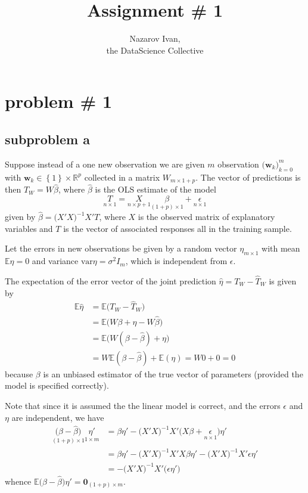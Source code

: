 \documentclass[a4paper]{article}
\title{Assignment \# 1}
\author{Nazarov Ivan, \rus{101мНОД(ИССА)}\\the DataScience Collective}
\newcommand{\obj}[1]{{\left\{ #1 \right \}}}
\newcommand{\w}{\mathbf{w}}
\newcommand{\Real}{\mathbb{R}}
\newcommand{\Ex}{\mathbb{E}}
\newcommand{\Var}{\text{var}}
\begin{document}
\maketitle

\tableofcontents
\clearpage

\section{problem \# 1} %
\label{sec:problem_1}

\subsection{subproblem a} %
\label{sub:subproblem_a}

Suppose instead of a one new observation we are given $m$ observation
$\big(\w_k\big)_{k=0}^m$ with $\w_k\in \obj{1}\times\Real^p$
collected in a matrix $W_{m\times 1+p}$. The vector of predictions
is then $\hat{T}_W = W\hat{\beta}$, where $\hat{\beta}$ is the OLS estimate of
the model
\[ \underset{n\times 1}{T} = \underset{n\times p+1}{X} \underset{(1+p)\times 1}{\beta} + \underset{n\times 1}{\epsilon}\]
given by $\hat{\beta} = \big(X'X\big)^{-1} X'T$, where $X$ is the observed matrix of explanatory variables and $T$ is the vector of associated responses
all in the training sample.

Let the errors in new observations be given by a random vector $\eta_{m\times 1}$ with mean $\Ex \eta = 0$ and variance $\Var \eta = \sigma^2 I_m$,
which is independent from $\epsilon$.

The expectation of the error vector of the joint prediction $\hat{\eta} = T_W - \hat{T}_W$ is given by
\begin{align*}
	\Ex \hat{\eta} &= \Ex\Big( T_W - \hat{T}_W \Big) \\
	&= \Ex\Big( W\beta + \eta - W\hat{\beta} \Big) \\
	&= \Ex\Big( W (\beta - \hat{\beta}) + \eta \Big) \\
	&= W \Ex(\beta - \hat{\beta}) + \Ex(\eta) = W 0 + 0 = 0
\end{align*}
because $\beta$ is an unbiased estimator of the true vector of parameters
(provided the model is specified correctly).

Note that since it is assumed the the linear model is correct, and the errors
$\epsilon$ and $\eta$ are independent, we have
\begin{align*}
	\underset{(1+p)\times 1}{\big(\beta-\hat{\beta}\big)}\underset{1\times m}{\eta'}
	&= \beta\eta' - \big(X'X\big)^{-1} X'\big(X\beta + \underset{n\times 1}{\epsilon}) \eta' \\
	&= \beta\eta' - \big(X'X\big)^{-1} X'X\beta\eta' - \big(X'X\big)^{-1} X'\epsilon \eta' \\
	&=  - \big(X'X\big)^{-1} X' \big( \epsilon \eta' \big)
\end{align*}
whence $\Ex \big(\beta-\hat{\beta}\big)\eta' = \mathbf{0}_{(1+p)\times m}$.
\end{document}
